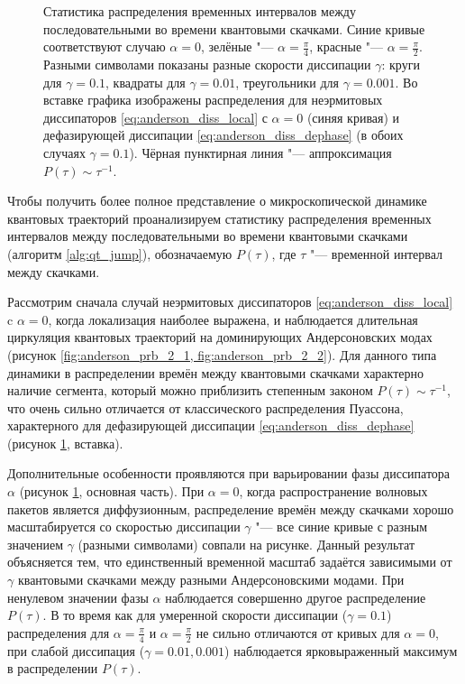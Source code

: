 \begin{figure}[h]
	\caption[Статистика распределения временных интервалов между последовательными во времени квантовыми скачками для разных режимов распространения волновых пакетов]{
		Статистика распределения временных интервалов между последовательными во времени квантовыми скачками. Синие кривые соответствуют случаю \(\alpha=0\), зелёные "--- \(\alpha = \frac{\pi}{4}\), красные "--- \(\alpha = \frac{\pi}{2}\). Разными символами показаны разные скорости диссипации \(\gamma\):  круги для \(\gamma=0.1\), квадраты для \(\gamma=0.01\), треугольники для \(\gamma=0.001\). Во вставке графика изображены распределения для неэрмитовых диссипаторов \cref{eq:anderson_diss_local} с \(\alpha=0\) (синяя кривая) и дефазирующей диссипации \cref{eq:anderson_diss_dephase} (в обоих случаях \(\gamma=0.1\)). Чёрная пунктирная линия "--- аппроксимация \(P(\tau) \sim \tau^{-1}\).
	}
	\label{fig:anderson_prb_5}
\end{figure}

Чтобы получить более полное представление о микроскопической динамике квантовых траекторий проанализируем статистику распределения временных интервалов между последовательными во времени квантовыми скачками (алгоритм \ref{alg:qt_jump}), обозначаемую \(P(\tau)\), где \(\tau\) "--- временной интервал между скачками.

Рассмотрим сначала случай неэрмитовых диссипаторов \cref{eq:anderson_diss_local} c \(\alpha=0\), когда локализация наиболее выражена, и наблюдается длительная циркуляция квантовых  траекторий на доминирующих Андерсоновских модах (рисунок \cref{fig:anderson_prb_2_1, fig:anderson_prb_2_2}). 
Для данного типа динамики в распределении времён между квантовыми скачками  характерно наличие сегмента, который можно приблизить степенным законом \(P(\tau) \sim \tau^{-1}\), что очень сильно отличается от классического распределения Пуассона, характерного для дефазирующей диссипации \cref{eq:anderson_diss_dephase} (рисунок \cref{fig:anderson_prb_5}, вставка).

Дополнительные особенности проявляются при варьировании фазы диссипатора \(\alpha\) (рисунок \cref{fig:anderson_prb_5}, основная часть).
При \(\alpha=0\), когда распространение волновых пакетов является диффузионным, распределение времён между скачками хорошо масштабируется со скоростью диссипации \(\gamma\) "--- все синие кривые с разным значением \(\gamma\) (разными символами) совпали на рисунке.
Данный результат объясняется тем, что единственный временной масштаб задаётся зависимыми от \(\gamma\) квантовыми скачками между разными Андерсоновскими модами.
При ненулевом значении фазы \(\alpha\) наблюдается совершенно другое распределение \(P(\tau)\). 
В то время как для умеренной скорости диссипации (\(\gamma = 0.1\)) распределения для \(\alpha = \frac{\pi}{4}\) и \(\alpha = \frac{\pi}{2}\) не сильно отличаются от кривых для \(\alpha=0\), при слабой диссипация (\(\gamma = 0.01, 0.001\)) наблюдается ярковыраженный максимум в распределении \(P(\tau)\).


